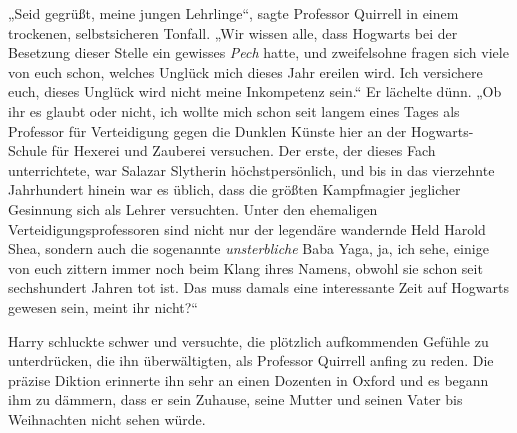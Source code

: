 „Seid gegrüßt, meine jungen Lehrlinge“, sagte Professor Quirrell in einem trockenen, selbstsicheren Tonfall. „Wir wissen alle, dass Hogwarts bei der Besetzung dieser Stelle ein gewisses \emph{Pech} hatte, und zweifelsohne fragen sich viele von euch schon, welches Unglück mich dieses Jahr ereilen wird. Ich versichere euch, dieses Unglück wird nicht meine Inkompetenz sein.“ Er lächelte dünn. „Ob ihr es glaubt oder nicht, ich wollte mich schon seit langem eines Tages als Professor für Verteidigung gegen die Dunklen Künste hier an der Hogwarts-Schule für Hexerei und Zauberei versuchen. Der erste, der dieses Fach unterrichtete, war Salazar Slytherin höchstpersönlich, und bis in das vierzehnte Jahrhundert hinein war es üblich, dass die größten Kampfmagier jeglicher Gesinnung sich als Lehrer versuchten. Unter den ehemaligen Verteidigungsprofessoren sind nicht nur der legendäre wandernde Held Harold Shea, sondern auch die sogenannte \emph{unsterbliche} Baba Yaga, ja, ich sehe, einige von euch zittern immer noch beim Klang ihres Namens, obwohl sie schon seit sechshundert Jahren tot ist. Das muss damals eine interessante Zeit auf Hogwarts gewesen sein, meint ihr nicht?“

Harry schluckte schwer und versuchte, die plötzlich aufkommenden Gefühle zu unterdrücken, die ihn überwältigten, als Professor Quirrell anfing zu reden. Die präzise Diktion erinnerte ihn sehr an einen Dozenten in Oxford und es begann ihm zu dämmern, dass er sein Zuhause, seine Mutter und seinen Vater bis Weihnachten nicht sehen würde.

